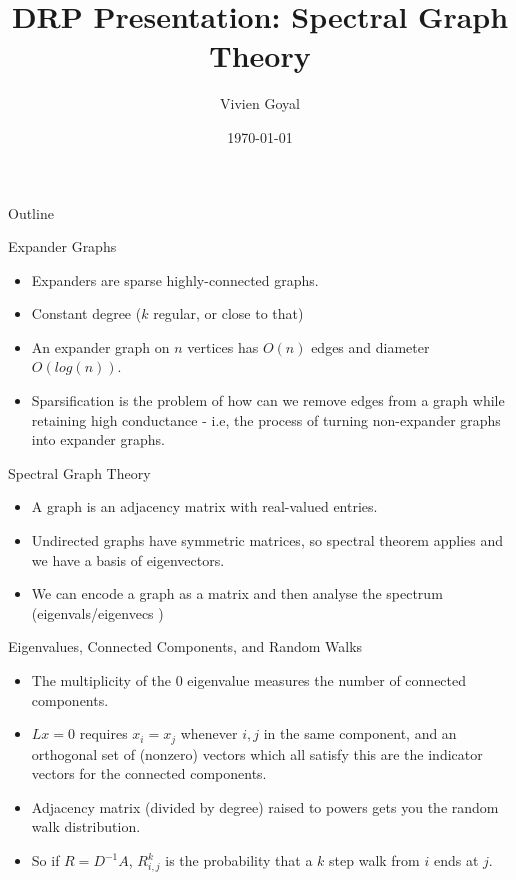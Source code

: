 \documentclass[presentation]{beamer}
\author{Vivien Goyal}
\date{\today}
\title{DRP Presentation: Spectral Graph Theory}
\begin{document}
\maketitle
\begin{frame}{Outline}
\tableofcontents
\end{frame}

\begin{frame}[label={sec:orgbe1cffc}]{Expander Graphs}
\begin{itemize}
\item Expanders are sparse highly-connected graphs.
\item Constant degree (\(k\) regular, or close to that)
\item An expander graph on \(n\) vertices has \(O(n)\) edges and diameter \(O(log(n))\).
\item Sparsification is the problem of how can we remove edges from a graph while retaining high conductance - i.e, the process of turning non-expander graphs into expander graphs.
\end{itemize}
\end{frame}
\begin{frame}[label={sec:org6fd8822}]{Spectral Graph Theory}
\begin{itemize}
\item A graph is an adjacency matrix with real-valued entries.
\item Undirected graphs have symmetric matrices, so spectral theorem applies and we have a basis of eigenvectors.
\item We can encode a graph as a matrix and then analyse the spectrum (eigenvals/eigenvecs )
\end{itemize}
\end{frame}
\begin{frame}[label={sec:org516143a}]{Eigenvalues, Connected Components, and Random Walks}
\begin{itemize}
\item The multiplicity of the \(0\) eigenvalue measures the number of connected components.
\item \(Lx=0\) requires \(x_i=x_j\) whenever \(i,j\) in the same component, and an orthogonal set of (nonzero) vectors which all satisfy this are the indicator vectors for the connected components.
\item Adjacency matrix (divided by degree) raised to powers gets you the random walk distribution.
\item So if \(R=D^{-1}A\), \(R^k_{i,j}\) is the probability that a \(k\) step walk from \(i\) ends at \(j\).
\end{itemize}
\end{frame}
\end{document}
